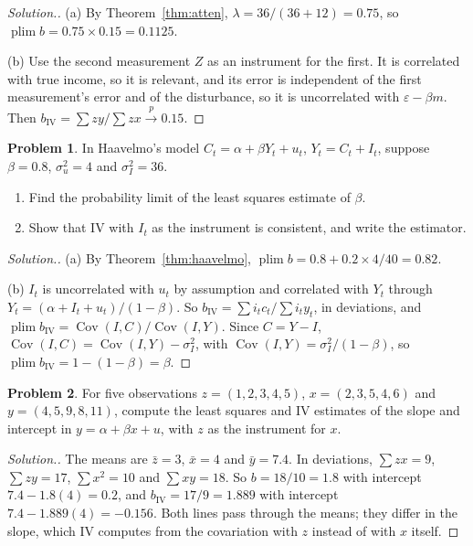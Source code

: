 \documentclass[11pt,a4paper]{article}
\numberwithin{equation}{section}
\DeclareMathOperator{\Cov}{Cov}
\DeclareMathOperator{\plim}{plim}
\theoremstyle{definition}
\newtheorem{problemx}{Problem}[subsection]
\newenvironment{problem}{\begin{problemx}}{\end{problemx}}
\newenvironment{solution}
  {\renewcommand{\qedsymbol}{}\begin{proof}[\textit{Solution}.]}
  {\end{proof}}
\begin{document}
\begin{solution}
(a) By Theorem~\ref{thm:atten}, $\lambda = 36/(36 + 12) = 0.75$, so $\plim b = 0.75 \times 0.15 = 0.1125$.

(b) Use the second measurement $Z$ as an instrument for the first. It is correlated with true income, so it is relevant, and its error is
independent of the first measurement's error and of the disturbance, so it is uncorrelated with $\varepsilon - \beta m$. Then $b_{\text{IV}} = \sum zy/\sum zx \xrightarrow{p} 0.15$.
\end{solution}

\begin{problem}
In Haavelmo's model $C_t = \alpha + \beta Y_t + u_t$, $Y_t = C_t + I_t$, suppose $\beta = 0.8$, $\sigma_u^2 = 4$ and $\sigma_I^2 = 36$.
\begin{enumerate}[label=(\alph*)]
\item Find the probability limit of the least squares estimate of $\beta$.
\item Show that IV with $I_t$ as the instrument is consistent, and write the estimator.
\end{enumerate}
\end{problem}

\begin{solution}
(a) By Theorem~\ref{thm:haavelmo}, $\plim b = 0.8 + 0.2 \times 4/40 = 0.82$.

(b) $I_t$ is uncorrelated with $u_t$ by assumption and correlated with $Y_t$ through $Y_t = (\alpha + I_t + u_t)/(1 - \beta)$. So $b_{\text{IV}} = \sum i_tc_t/\sum i_ty_t$, in deviations, and
$\plim b_{\text{IV}} = \Cov(I, C)/\Cov(I, Y)$. Since $C = Y - I$, $\Cov(I, C) = \Cov(I, Y) - \sigma_I^2$, with $\Cov(I, Y) = \sigma_I^2/(1 - \beta)$, so $\plim b_{\text{IV}} = 1 - (1 - \beta) = \beta$.
\end{solution}

\begin{problem}
For five observations $z = (1, 2, 3, 4, 5)$, $x = (2, 3, 5, 4, 6)$ and $y = (4, 5, 9, 8, 11)$, compute the least squares and IV estimates of the slope and
intercept in $y = \alpha + \beta x + u$, with $z$ as the instrument for $x$.
\end{problem}

\begin{solution}
The means are $\bar z = 3$, $\bar x = 4$ and $\bar y = 7.4$. In deviations, $\sum zx = 9$, $\sum zy = 17$, $\sum x^2 = 10$ and $\sum xy = 18$. So $b = 18/10 = 1.8$ with intercept
$7.4 - 1.8(4) = 0.2$, and $b_{\text{IV}} = 17/9 = 1.889$ with intercept $7.4 - 1.889(4) = -0.156$. Both lines pass through the means; they differ in the slope, which IV computes from the
covariation with $z$ instead of with $x$ itself.
\end{solution}
\end{document}
